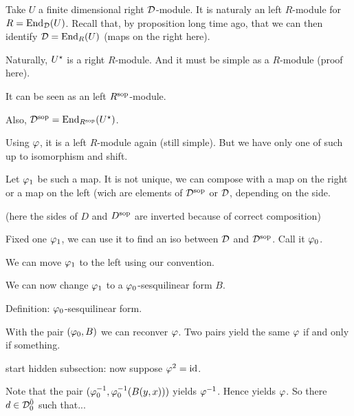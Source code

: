 \documentclass{amsbook}
\begin{document}
\begin{todolist}
        \item Take $U$ a finite dimensional right $\mathcal{D}$-module. It is naturaly an left $R$-module for $R = \operatorname{End}_{\mathcal{D}} (U)$. Recall that, by proposition long time ago, that we can then identify $\mathcal{D} = \operatorname{End}_R(U)$ (maps on the right here).
        
        \item Naturally, $U^\star$ is a right $R$-module. And it must be simple as a $R$-module (proof here).
        
        \item It can be seen as an left $R^{\mathrm{sop}}$-module.
        
        \item Also, $\mathcal{D}^{\mathrm{sop}} = \operatorname{End}_{R^{\mathrm{sop}}} (U^\star)$.
        
        \item Using $\varphi$, it is a left $R$-module again (still simple). But we have only one of such up to isomorphism and shift.
        
        \item Let $\varphi_1$ be such a map. It is not unique, we can compose with a map on the right or a map on the left (wich are elements of $\mathcal{D}^{\mathrm{sop}}$ or $\mathcal{D}$, depending on the side.
        
        \item (here the sides of $D$ and $D^{\mathrm{sop}}$ are inverted because of correct composition)
        
        \item Fixed one $\varphi_1$, we can use it to find an iso between $\mathcal{D}$ and $\mathcal{D}^{\mathrm{sop}}$. Call it $\varphi_0$.
        
        \item We can move $\varphi_1$ to the left using our convention.
        
        \item We can now change $\varphi_1$ to a $\varphi_0$-sesquilinear form $B$.
        
        \item Definition: $\varphi_0$-sesquilinear form.
        
        \item With the pair $(\varphi_0, B)$ we can reconver $\varphi$. Two pairs yield the same $\varphi$ if and only if something.
        
        \item start hidden subsection: now suppose $\varphi^2 = \operatorname{id}$.
        
        \item Note that the pair $(\varphi_0^{-1}, \varphi_0^{-1} (B (y,x)))$ yields $\varphi^{-1}$. Hence yields $\varphi$. So there $d\in \mathcal{D}^{\bar0}_0$ such that...
        

\end{todolist}
\end{document}
